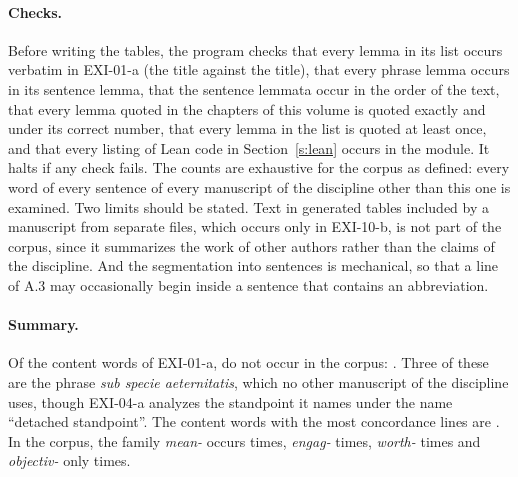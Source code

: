 \paragraph{Checks.} Before writing the tables, the program checks that every lemma in its list occurs verbatim in EXI-01-a (the title against the title), that every phrase lemma occurs in its sentence lemma, that the sentence lemmata occur in the order of the text, that every lemma quoted in the chapters of this volume is quoted exactly and under its correct number, that every lemma in the list is quoted at least once, and that every listing of Lean code in Section~\ref{s:lean} occurs in the module. It halts if any check fails. The counts are exhaustive for the corpus as defined: every word of every sentence of every manuscript of the discipline other than this one is examined. Two limits should be stated. Text in generated tables included by a manuscript from separate files, which occurs only in EXI-10-b, is not part of the corpus, since it summarizes the work of other authors rather than the claims of the discipline. And the segmentation into sentences is mechanical, so that a line of A.3 may occasionally begin inside a sentence that contains an abbreviation.

\paragraph{Summary.} Of the \cnContent{} content words of EXI-01-a, \cnUnshared{} do not occur in the corpus: \cnUnsharedList. Three of these are the phrase \emph{sub specie aeternitatis}, which no other manuscript of the discipline uses, though EXI-04-a analyzes the standpoint it names under the name \enquote{detached standpoint}. The content words with the most concordance lines are \cnTopKwic. In the corpus, the family \textit{mean-} occurs \cnFammean{} times, \textit{engag-} \cnFamengag{} times, \textit{worth-} \cnFamworth{} times and \textit{objectiv-} only \cnFamobjectiv{} times.

